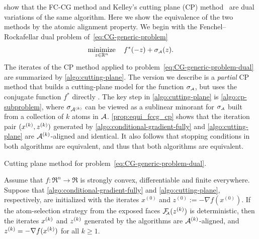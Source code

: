 \citet{bertsekas2011unifying} show that the FC-CG method and Kelley’s cutting
plane (CP) method~\cite{kelley1960cutting} are dual variations of the same
algorithm. Here we show the equivalence of the two methods by the atomic alignment
property. We begin with the Fenchel–Rockafellar dual problem
of~\eqref{eq:CG-generic-problem}
\begin{equation} \label{eq:CG-generic-problem-dual}
     \displaystyle\mathop{\hbox{\rm minimize}}_{z\in\mathbb{R}^n}\enspace\enspace f^*(-z) + \sigma_{\scriptscriptstyle\mathcal{A}}(z).
\end{equation} 
The iterates of the CP method applied to
problem~\eqref{eq:CG-generic-problem-dual} are summarized by
\autoref{algo:cutting-plane}. The version we describe is a \emph{partial} CP method that builds a cutting-plane model for the function $\sigma_{\scriptscriptstyle\mathcal{A}}$, but uses the
conjugate function  $f^*$ directly \citep{fan2019bundle}. The key step in
\autoref{algo:cutting-plane} is \autoref{algo:cp-subproblem}, where $\sigma_{\mathcal{A}^{(k)}}$
can be viewed as a sublinear minorant for $\sigma_{\scriptscriptstyle\mathcal{A}}$ built from a collection of
$k$ atoms in $\mathcal{A}$. \autoref{prop:equi_fccg_cp} shows that the iteration pair
$(x^{(k)},z^{(k)})$ generated by
\autoref{algo:conditional-gradient-fully} and \autoref{algo:cutting-plane} are $\mathcal{A}^{(k)}$-aligned
and identical.
It also follows that stopping conditions in both algorithms are equivalent, and thus that both algorithms are equivalent.

\begin{algorithm}[t]
  \DontPrintSemicolon\setcounter{AlgoLine}{-1}
  \caption{Cutting plane method for problem~\eqref{eq:CG-generic-problem-dual}.}
  \label{algo:cutting-plane}
\end{algorithm}

\begin{proposition}
  \label{prop:equi_fccg_cp}
    Assume that $f:\Re^n\to\Re$ is strongly convex, differentiable and finite everywhere.
    Suppose that \autoref{algo:conditional-gradient-fully} and \autoref{algo:cutting-plane},
    respectively, are initialized with the iterates $x^{(0)}$ and $z^{(0)} :=
    -\nabla f(x^{(0)})$. If the atom-selection strategy from the exposed faces
    $\mathcal{F}_{\!\!\scriptscriptstyle\mathcal{A}}(z^{(k)})$ is deterministic, then the iterates $x^{(k)}$ and $z^{(k)}$ generated by
    the algorithms are $\mathcal{A}^{(k)}$-aligned, and $z^{(k)} = -\nabla f(x^{(k)})$ for all
    $k\ge1$.
\end{proposition}

